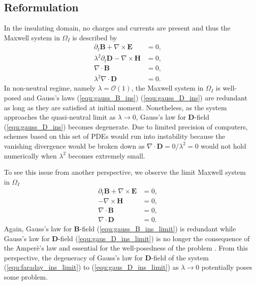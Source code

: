 \documentclass{article}
\begin{document}
\subsection{Reformulation}
In the insulating domain, no charges and currents are present and thus the Maxwell system in $\Omega_I$ is described by    
\begin{align}
    \partial_t \mathbf{B} + \nabla \times \mathbf{E} &= 0, \label{equ:faraday_ins}\\ 
    \lambda^2 \partial_t \mathbf{D} - \nabla \times \mathbf{H} &= 0,  \label{equ:ampere_ins}\\
    \nabla \cdot \mathbf{B} &= 0, \label{equ:gauss_B_ins}\\
    \lambda^2 \nabla \cdot \mathbf{D} &= 0 \label{equ:gauss_D_ins}.
\end{align}
In non-neutral regime, namely $\lambda = \mathcal{O}(1)$, the Maxwell system in $\Omega_I$ is well-posed and Gauss's laws (\ref{equ:gauss_B_ins}) (\ref{equ:gauss_D_ins}) are redundant as long as they are satisfied at initial moment. Nonetheless, as the system approaches the quasi-neutral limit as $\lambda \rightarrow 0$, Gauss's law for $\mathbf{D}$-field (\ref{equ:gauss_D_ins}) becomes degenerate. Due to limited precision of computers, schemes based on this set of PDEs would run into instability because the vanishing divergence would be broken down as $\nabla \cdot \mathbf{D} = 0/\lambda^2 = 0$ would not hold numerically when $\lambda^2$ becomes extremely small. 

To see this issue from another perspective, we observe the limit Maxwell system in $\Omega_I$
\begin{align}
    \partial_t \mathbf{B} + \nabla \times \mathbf{E} &= 0, \label{equ:faraday_ins_limit}\\ 
    - \nabla \times \mathbf{H} &= 0,  \label{equ:ampere_ins_limit}\\
    \nabla \cdot \mathbf{B} &= 0, \label{equ:gauss_B_ins_limit}\\
    \nabla \cdot \mathbf{D} &= 0 \label{equ:gaus_D_ins_limit}.
\end{align}
Again, Gauss's law for $\mathbf{B}$-field (\ref{equ:gauss_B_ins_limit}) is redundant while Gauss's law for $\mathbf{D}$-field (\ref{equ:gaus_D_ins_limit}) is no longer the consequence of the Amper\`{e}'s law and essential for the well-posedness of the problem \citep{ana_2010}. From this perspective, the degeneracy of Gauss's law for $\mathbf{D}$-field of the system (\ref{equ:faraday_ins_limit}) to (\ref{equ:gaus_D_ins_limit}) as $\lambda \rightarrow 0$ potentially poses some problem.
\end{document}
